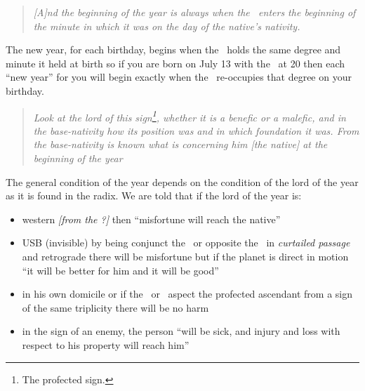 \begin{quote}
\textsl{[A]nd the beginning of the year is always when the \Sun\, enters the beginning of the minute in which it was on the day of the native's nativity.}
\end{quote}

The new year, for each birthday, begins when the \Sun\, holds the same degree and minute it held at birth so if you are born on July 13 with the \Sun\, at 20 then each ``new year'' for you will begin exactly when the \Sun\, re-occupies that degree on your birthday.

\begin{quote}
\textsl{Look at the lord of this sign\footnote{The profected sign.}, whether it is a benefic or a malefic, and in the base-nativity how its position was and in which foundation it was. From the base-nativity is known what is concerning him [the native] at the beginning of the year}
\end{quote}

The general condition of the year depends on the condition of the lord of the year as it is found in the radix. We are told that if the lord of the year is:
\begin{itemize}[topsep=0em,itemsep=0em]
\item western \textsl{[from the \Sun?]} then ``misfortune will reach the native''

\item USB (invisible) by being conjunct the \Sun\, or opposite the \Sun\, in \textsl{curtailed passage} and retrograde there will be misfortune but if the planet is direct in motion ``it will be better for him and it will be good''

\item in his own domicile or if the \Sun\, or \Moon\, aspect the profected ascendant from a sign of the same triplicity there will be no harm

\item in the sign of an enemy, the person ``will be sick, and injury and loss with respect to his property will reach him''
\end{itemize}